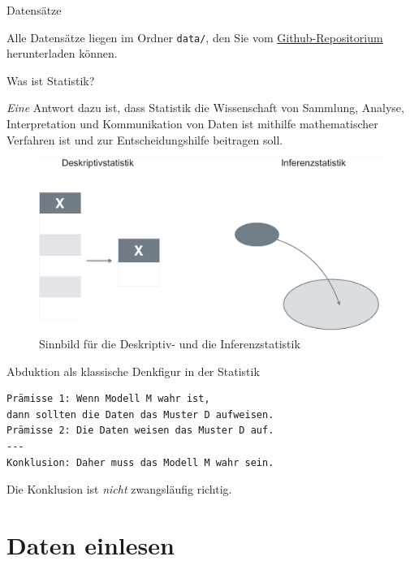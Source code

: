 \begin{frame}[fragile]{Datensätze}

Alle Datensätze liegen im Ordner \texttt{data/}, den Sie vom
\href{https://github.com/sebastiansauer/Praxis_der_Datenanalyse}{Github-Repositorium}
herunterladen können.

\end{frame}

\begin{frame}{Was ist Statistik?}

\emph{Eine} Antwort dazu ist, dass Statistik die Wissenschaft von
Sammlung, Analyse, Interpretation und Kommunikation von Daten ist
mithilfe mathematischer Verfahren ist und zur Entscheidungshilfe
beitragen soll.

\begin{figure}

{\centering \includegraphics[width=0.8\linewidth]{../images/Rahmen/desk_vs_inf-crop} 

}

\caption{Sinnbild für die Deskriptiv- und die Inferenzstatistik}\label{fig:desk-vs-inf}
\end{figure}

\end{frame}

\begin{frame}[fragile]{Abduktion als klassische Denkfigur in der
Statistik}

\begin{verbatim}
Prämisse 1: Wenn Modell M wahr ist,   
dann sollten die Daten das Muster D aufweisen.
Prämisse 2: Die Daten weisen das Muster D auf.
---
Konklusion: Daher muss das Modell M wahr sein.
\end{verbatim}

Die Konklusion ist \emph{nicht} zwangsläufig richtig.

\end{frame}

\section{Daten einlesen}\label{tidy}

